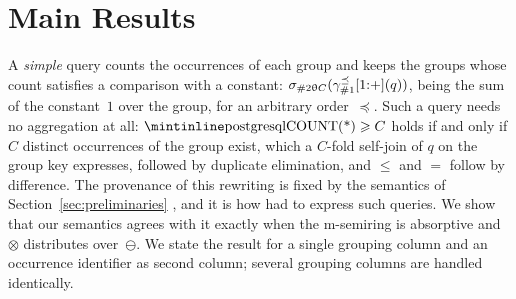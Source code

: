 \section{Main Results}
\label{sec:results}
A \emph{simple}  query counts the occurrences of each group
and keeps the groups whose count satisfies a comparison with a constant:
$\sigma_{\#2\mathrel{\uptheta} C}(\gamma^{\preceq}_{\#1}[1{:}+](q))$,  being
the sum of the constant~$1$ over the group, for an arbitrary
order~$\preceq$. Such a query needs no aggregation at all:
$\text{\sql{COUNT(*)}}\geq C$ holds if and only if $C$ distinct occurrences of
the group exist, which a $C$-fold self-join of $q$ on the group key
expresses, followed by duplicate elimination, and $\leq$ and $=$ follow
by difference. The provenance of this rewriting is fixed by the semantics
of Section~\ref{sec:preliminaries}
\cite{green2007provenance,geerts2010database,sen2026provsql}, and it is
how \cite{yunus2025using} had to express such queries. We show that our
semantics agrees with it exactly when the m-semiring is absorptive and
$\otimes$ distributes over~$\ominus$. We state the result for a single
grouping column and an occurrence identifier as second column; several
grouping columns are handled identically.
